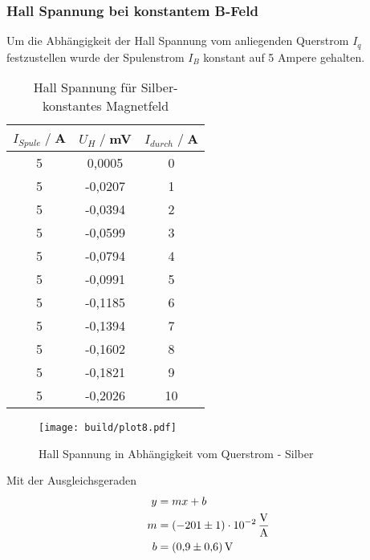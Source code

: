 \subsubsection{Hall Spannung bei konstantem B-Feld}
Um die Abhängigkeit der Hall Spannung vom anliegenden Querstrom $I_q$ festzustellen wurde der Spulenstrom $I_B$ konstant auf 5 Ampere gehalten.
\begin{table}[H]
    \centering
    \begin{tabular}{c c c}
        \toprule
        $I_{Spule} \;/\;$A & $U_H\;/\;$mV & $I_{durch} \;/\;$A\\
        \midrule
  5                   &0,0005&              0\\
  5                   &-0,0207&             1\\
  5                   &-0,0394&             2\\
  5                   &-0,0599&             3\\
  5                   &-0,0794&             4\\
  5                   &-0,0991&             5\\
  5                   &-0,1185&             6\\
  5                   &-0,1394&             7\\
  5                   &-0,1602&             8\\
  5                   &-0,1821&             9\\
  5                   &-0,2026&             10\\

       \bottomrule
    \end{tabular}
    \caption{Hall Spannung für Silber- konstantes Magnetfeld}
    \label{tab:Ag_I}
\end{table}
\begin{figure}[H]
    \centering
    \texttt{[image: build/plot8.pdf]}
    \caption{Hall Spannung in Abhängigkeit vom Querstrom - Silber}
    \label{fig:Ag_I}
\end{figure}
Mit der Ausgleichsgeraden
\begin{align*}
    y &= mx + b\\
    m &= \SI{-201 \pm 1 e-02}{\volt \per \ampere} \\
    b &= \SI{0,9 \pm 0,6}{\volt}\\
\end{align*}

